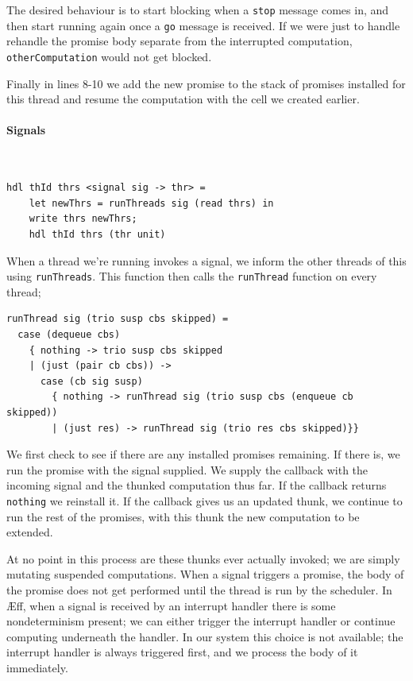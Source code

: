 \documentclass[msc,deptreport,cs]{infthesis} %
\newcommand{\code}[1]{\lstinline{#1}}
\newcommand\aeff{{\AE}ff\xspace}
\begin{document}
The desired behaviour is to start blocking when a \code{stop} message comes in,
and then start running again once a \code{go} message is received. If we were
just to handle rehandle the promise body separate from the interrupted
computation, \code{otherComputation} would not get blocked.

Finally in lines 8-10 we add the new promise to the stack of promises installed
for this thread and resume the computation with the cell we created earlier.

\paragraph*{Signals} ~

\begin{lstlisting}
hdl thId thrs <signal sig -> thr> =
    let newThrs = runThreads sig (read thrs) in
    write thrs newThrs;
    hdl thId thrs (thr unit)
\end{lstlisting}

When a thread we're running invokes a signal, we inform the other threads of
this using \code{runThreads}. This function then calls the \code{runThread}
function on every thread;


\begin{lstlisting}
runThread sig (trio susp cbs skipped) =
  case (dequeue cbs)
    { nothing -> trio susp cbs skipped
    | (just (pair cb cbs)) ->
      case (cb sig susp)
        { nothing -> runThread sig (trio susp cbs (enqueue cb skipped))
        | (just res) -> runThread sig (trio res cbs skipped)}}
\end{lstlisting}

\noindent We first check to see if there are any installed promises remaining.
If there is, we run the promise with the signal supplied. We supply the callback
with the incoming signal and the thunked computation thus far. If the callback
returns \code{nothing} we reinstall it. If the callback gives us an updated
thunk, we continue to run the rest of the promises, with this thunk the new
computation to be extended.

At no point in this process are these thunks ever actually invoked; we are
simply mutating suspended computations. When a signal triggers a promise, the
body of the promise does not get performed until the thread is run by the
scheduler. In \aeff, when a signal is received by an interrupt handler there is
some nondeterminism present; we can either trigger the interrupt handler or
continue computing underneath the handler. In our system this choice is not
available; the interrupt handler is always triggered first, and we process the
body of it immediately.
\end{document}
